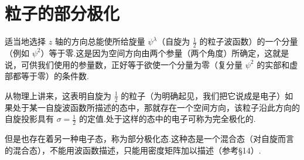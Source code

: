 \section{粒子的部分极化}

适当地选择 $z$ 轴的方向总能使所给旋量 $\psi^{\lambda}$（自旋为 $\frac{1}{2}$ 的粒子波函数）的一个分量（例如 $\psi^2$）等于零.这是因为空间方向由两个参量（两个角度）所确定，这就是说，可供我们使用的参量数，正好等于欲使一个分量为零（复分量 $\psi^2$ 的实部和虚部都等于零）的条件数.

从物理上讲来，这表明自旋为 $\frac{1}{2}$ 的粒子（为明确起见，我们把它说成是电子）如果处于某一自旋波函数所描述的态中，那就存在一个空间方向，该粒子沿此方向的自旋投影具有 $\sigma=\frac{1}{2}$ 的定值.处于这样的态中的电子可称为完全极化的.

但是也存在着另一种电子态，称为部分极化态.这种态是一个混合态（对自旋而言的混合态），不能用波函数描述，只能用密度矩阵加以描述（参考§14）.

